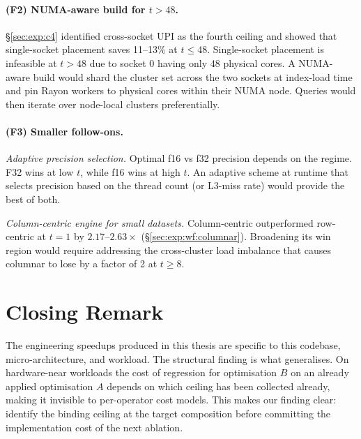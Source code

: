 \paragraph{(F2) NUMA-aware build for $t > 48$.}
§\ref{sec:exp:c4} identified cross-socket UPI as the fourth ceiling and showed that single-socket placement saves 11--13\% at $t \leq 48$. Single-socket placement is infeasible at $t >  48$ due to socket 0 having only 48 physical cores. A NUMA-aware build would shard the cluster set across the two sockets at index-load time and pin Rayon workers to physical cores within their NUMA node. Queries would then iterate over node-local clusters preferentially.

\paragraph{(F3) Smaller follow-ons.}

\textit{Adaptive precision selection.} Optimal f16 vs f32 precision depends on the regime. F32 wins at low $t$, while f16 wins at high $t$. An adaptive scheme at runtime that selects precision based on the thread count (or L3-miss rate) would provide the best of both.

\textit{Column-centric engine for small datasets.} Column-centric outperformed row-centric at $t=1$ by $2.17$--$2.63\times$ (§\ref{sec:exp:wf:columnar}). Broadening its win region would require addressing the cross-cluster load imbalance that causes columnar to lose by a factor of 2 at $t \geq 8$.

\section{Closing Remark}

The engineering speedups produced in this thesis are specific to this codebase, micro-architecture, and workload. The structural finding is what generalises. On hardware-near workloads the cost of regression for optimisation $B$ on an already applied optimisation $A$ depends on which ceiling has been collected already, making it invisible to per-operator cost models. This makes our finding clear: identify the binding ceiling at the target composition before committing the implementation cost of the next ablation.
